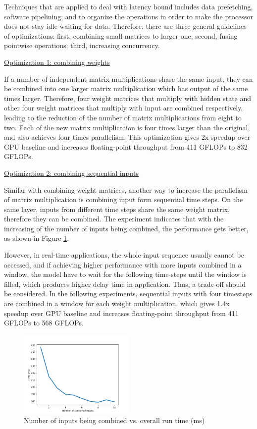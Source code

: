\documentclass{article}
\begin{document}
Techniques that are applied to deal with latency bound includes data prefetching, software pipelining, and to organize the operations in order to make the processor does not stay idle waiting for data. Therefore, there are three general guidelines of optimizations: first, combining small matrices to larger one; second, fusing pointwise operations; third, increasing concurrency.

\underline{\large{Optimization 1: combining weights}}

If a number of independent matrix multiplications share the same input, they can be combined into one larger matrix multiplication which has output of the same times larger. Therefore, four weight matrices that multiply with hidden state and other four weight matrices that multiply with input are combined respectively, leading to the reduction of the number of matrix multiplications from eight to two. Each of the new matrix multiplication is four times larger than the original, and also achieves four times parallelism. This optimization gives 2x speedup over GPU baseline and increases floating-point throughput from 411 GFLOPs to 832 GFLOPs. 

\underline{\large{Optimization 2: combining sequential inputs}}

Similar with combining weight matrices, another way to increase the parallelism of matrix multiplication is combining input form sequential time steps. On the same layer, inputs from different time steps share the same weight matrix, therefore they can be combined. The experiment indicates that with the increasing of the number of inputs being combined, the performance gets better, as shown in Figure \ref{opt2}. 

However, in real-time applications, the whole input sequence usually cannot be accessed, and if achieving higher performance with more inputs combined in a window, the model have to wait for the following time-steps until the window is filled, which produces higher delay time in application. Thus, a trade-off should be considered. In the following experiments, sequential inputs with four timesteps are combined in a window for each weight multiplication, which gives 1.4x speedup over GPU baseline and increases floating-point throughput from 411 GFLOPs to 568 GFLOPs.

\begin{figure}[H]
\centering
\includegraphics[width=0.5\textwidth]{opt2}
\caption{Number of inputs being combined vs. overall run time (ms)}
\label{opt2}
\end{figure}
\end{document}
